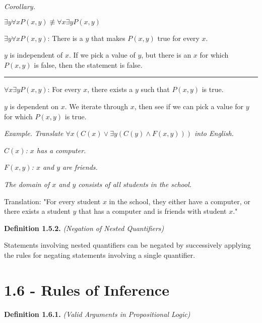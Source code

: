 \documentclass[12pt, letterpaper]{article}
\begin{document}
\bigskip

\textit{Corollary.}
\medskip

\medskip
{\centering

$ \exists y \forall x P(x, y) \not\equiv \forall x \exists y P(x, y) $

\medskip
}

$ \exists y \forall x P(x, y) $: There is a $ y $ that makes $ P(x, y) $ true for every $ x $.
\smallskip

$ y $ is independent of $ x $. If we pick a value of $ y $, but there is an $ x $ for which $ P(x, y) $ is false, then the statement is false.

\medskip
\hrule
\medskip

$ \forall x \exists y P(x, y) $: For every $ x $, there exists a $ y $ such that $ P(x, y) $ is true.
\smallskip

$ y $ is dependent on $ x $. We iterate through $ x $, then see if we can pick a value for $ y $ for which $ P(x, y) $ is true.
\bigskip

\textit{Example.}
\medskip
\textit{Translate $ \forall x ( C(x) \vee \exists y (C(y) \wedge F(x, y))) $ into English.}

\textit{ $ C(x) $: $ x $ has a computer. }

\textit{ $ F(x, y) $: $ x $ and $ y $ are friends. }

\textit{The domain of $ x $ and $ y $ consists of all students in the school. }
\medskip

Translation: "For every student $ x $ in the school, they either have a computer, or there exists a student $ y $ that has a computer and is friends with student $ x $."

\bigskip
\bigskip

\textbf{Definition 1.5.2.} \textit{(Negation of Nested Quantifiers)}
\medskip

Statements involving nested quantifiers can be negated by successively applying the rules for negating statements involving a single quantifier.


\pagebreak

\section*{1.6 - Rules of Inference}

\textbf{Definition 1.6.1.} \textit{(Valid Arguments in Propositional Logic)}
\medskip
\end{document}
